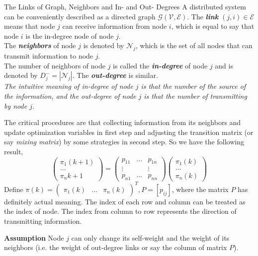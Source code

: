 	\begin{defn}{The Links of Graph, Neighbors and In- and Out- Degrees}{}
		A distributed system can be conveniently described as a directed graph $\mathscr{G}(\mathcal{V},\mathcal{E})$. The \textbf{\emph{link}} $(j,i)\in\mathcal{E}$ means that node $j$ can receive information from node $i$, which is equal to say that node $i$ is the in-degree node of node $j$. \\
		The \textbf{\emph{neighbors}} of node $j$ is denoted by $\mathcal{N}_j$, which is the set of all nodes that can transmit information to node $j$. \\
		The number of neighbors of node $j$ is called the \textbf{\emph{in-degree}} of node $j$ and is denoted by $D_j^{-}=|\mathcal{N}_j|$. The \textbf{\emph{out-degree}} is similar.\\
		\emph{The intuitive meaning of in-degree of node $j$ is that the number of the source of the information, and the out-degree of node $j$ is that the number of transmitting by node $j$.}
	\end{defn}
	The critical procedures are that collecting information from its neighbors and update optimization variables in first step and adjusting the transition matrix (or say \emph{mixing matrix}) by some strategies in second step. So we have the following result,
	$$
	\begin{pmatrix} \pi_1(k+1) \\ ...\\ \pi_n{k+1}\end{pmatrix} = \begin{pmatrix} p_{11} & ... & p_{1n} \\ \vdots & &\vdots \\ p_{n1} &... &p_{nn}\end{pmatrix} \begin{pmatrix}  \pi_1(k) \\ ...\\ \pi_n(k)\end{pmatrix}
	$$
	Define $\pi(k) =\begin{pmatrix} \pi_1(k) & ...& \pi_n(k)\end{pmatrix}^T, P=[p_{ij}]$, where the matrix $P$ has definitely actual meaning. The index of each row and column can be treated as the index of node. The index from column to row represents the direction of transmitting information.
	
	\textbf{Assumption} Node $j$ can only change its self-weight and the weight of its neighbors (i.e. the weight of out-degree links or say the column of matrix $P$).
	
